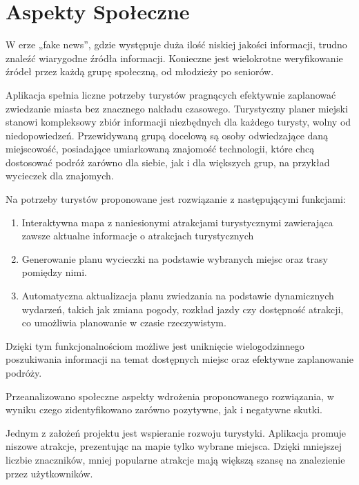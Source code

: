 
\section{Aspekty Społeczne}
\label{sec:aspekty-spoleczne}

W erze „fake news”, gdzie występuje duża ilość niskiej jakości informacji, trudno znaleźć wiarygodne źródła informacji.
Konieczne jest wielokrotne weryfikowanie źródeł przez każdą grupę społeczną, od młodzieży po seniorów.

\indent Aplikacja spełnia liczne potrzeby turystów pragnących efektywnie zaplanować zwiedzanie miasta bez znacznego nakładu czasowego.
Turystyczny planer miejski stanowi kompleksowy zbiór informacji niezbędnych dla każdego turysty, wolny od niedopowiedzeń.
Przewidywaną grupą docelową są osoby odwiedzające daną miejscowość, posiadające umiarkowaną znajomość technologii, które chcą dostosować podróż zarówno dla siebie, jak i dla większych grup, na przykład wycieczek dla znajomych.

\indent Na potrzeby turystów proponowane jest rozwiązanie z następującymi funkcjami:

\begin{enumerate}
   \item Interaktywna mapa z naniesionymi atrakcjami turystycznymi zawierająca zawsze aktualne informacje o atrakcjach turystycznych
   \item Generowanie planu wycieczki na podstawie wybranych miejsc oraz trasy pomiędzy nimi.
   \item Automatyczna aktualizacja planu zwiedzania na podstawie dynamicznych wydarzeń, takich jak zmiana pogody, rozkład jazdy czy dostępność atrakcji, co umożliwia planowanie w czasie rzeczywistym.
\end{enumerate}

Dzięki tym funkcjonalnościom możliwe jest uniknięcie wielogodzinnego poszukiwania informacji na temat dostępnych miejsc oraz efektywne zaplanowanie podróży.

\indent Przeanalizowano społeczne aspekty wdrożenia proponowanego rozwiązania, w wyniku czego zidentyfikowano zarówno pozytywne, jak i negatywne skutki.

\indent Jednym z założeń projektu jest wspieranie rozwoju turystyki.
Aplikacja promuje niszowe atrakcje, prezentując na mapie tylko wybrane miejsca.
Dzięki mniejszej liczbie znaczników, mniej popularne atrakcje mają większą szansę na znalezienie przez użytkowników.

